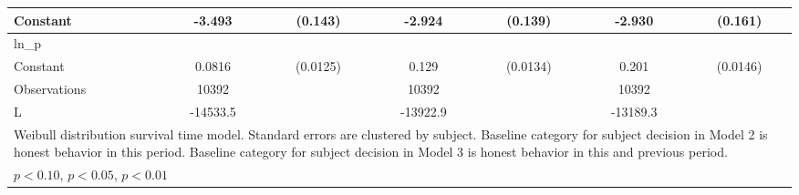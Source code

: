 {\begin{tabular}{l*{3}{cc}}
Constant        &   -3.493\sym{***}&  (0.143)&   -2.924\sym{***}&  (0.139)&   -2.930\sym{***}&  (0.161)\\
\hline
ln\_p            &                  &         &                  &         &                  &         \\
Constant        &   0.0816\sym{***}& (0.0125)&    0.129\sym{***}& (0.0134)&    0.201\sym{***}& (0.0146)\\
\hline
Observations    &    10392         &         &    10392         &         &    10392         &         \\
L               & -14533.5         &         & -13922.9         &         & -13189.3         &         \\
\hline\hline
\multicolumn{7}{l}{\footnotesize Weibull distribution survival time model. Standard errors are clustered by subject. Baseline category for subject decision in Model 2 is honest behavior in this period. Baseline category for subject decision in Model 3 is honest behavior in this and previous period.}\\
\multicolumn{7}{l}{\footnotesize \sym{*} \(p<0.10\), \sym{**} \(p<0.05\), \sym{***} \(p<0.01\)}\\
\end{tabular}
}
